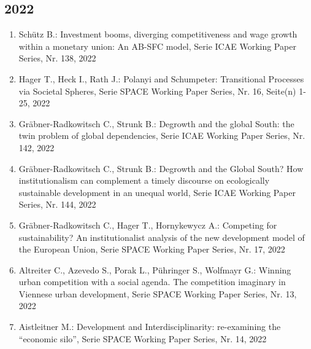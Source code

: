 \subsection*{2022}
\begin{enumerate}
    	 \item Schütz B.: Investment booms, diverging competitiveness and wage growth within a monetary union: An AB-SFC model, Serie ICAE Working Paper Series, Nr. 138, 2022
	 \item Hager T., Heck I., Rath J.: Polanyi and Schumpeter: Transitional Processes via Societal Spheres, Serie SPACE Working Paper Series, Nr. 16, Seite(n) 1-25, 2022
	 \item Gräbner-Radkowitsch C., Strunk B.: Degrowth and the global South: the twin problem of global dependencies, Serie ICAE Working Paper Series, Nr. 142, 2022
	 \item Gräbner-Radkowitsch C., Strunk B.: Degrowth and the Global South? How institutionalism can complement a timely discourse on ecologically sustainable development in an unequal world, Serie ICAE Working Paper Series, Nr. 144, 2022
	 \item Gräbner-Radkowitsch C., Hager T., Hornykewycz A.: Competing for sustainability? An institutionalist analysis of the new development model of the European Union, Serie SPACE Working Paper Series, Nr. 17, 2022
	 \item Altreiter C., Azevedo S., Porak L., Pühringer S., Wolfmayr G.: Winning urban competition with a social agenda. The competition imaginary in Viennese urban development, Serie SPACE Working Paper Series, Nr. 13, 2022
	 \item Aistleitner M.: Development and Interdisciplinarity: re-examining the “economic silo”, Serie SPACE Working Paper Series, Nr. 14, 2022
\end{enumerate}
